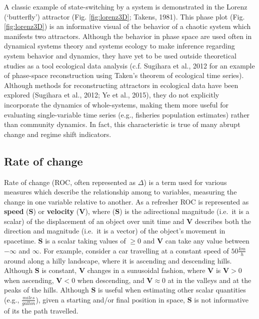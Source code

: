 \documentclass[12pt,twoside,openany]{reedthesis}
\begin{document}
A classic example of state-switching by a system is demonstrated in the Lorenz (`butterfly') attractor (Fig. \ref{fig:lorenz3D}; Takens, 1981). This phase plot (Fig. \ref{fig:lorenz3D}) is an informative visual of the behavior of a chaotic system which manifests two attractors. Although the behavior in phase space are used often in dynamical systems theory and systems ecology to make inference regarding system behavior and dynamics, they have yet to be used outside theoretical studies as a tool ecological data analysis (c.f. Sugihara et al., 2012 for an example of phase-space reconstruction using Taken's theorem of ecological time series). Although methods for reconstructing attractors in ecological data have been explored (Sugihara et al., 2012; Ye et al., 2015), they do not explicitly incorporate the dynamics of whole-systems, making them more useful for evaluating single-variable time series (e.g., fisheries population estimates) rather than community dynamics. In fact, this characteristic is true of many abrupt change and regime shift indicators.

\hypertarget{rate-of-change}{%
\subsection{Rate of change}\label{rate-of-change}}

Rate of change (ROC, often represented as \(\Delta\)) is a term used for various measures which describe the relationship among to variables, measuring the change in one variable relative to another. As a refresher ROC is represented as \textbf{speed} (\(\textbf{S}\)) or \textbf{velocity} (\(\textbf{V}\)), where (\(\textbf{S}\)) is the adirectional magnitude (i.e.~it is a scalar) of the displacement of an object over unit time and \(\textbf{V}\) describes both the direction and magnitude (i.e.~it is a vector) of the object's movement in spacetime. \(\textbf{S}\) is a scalar taking values of \(\geq0\) and \(\textbf{V}\) can take any value between \(-\infty\) and \(\infty\). For example, consider a car travelling at a constant speed of \(50\frac{km}{h}\) around along a hilly landscape, where it is ascending and descending hills. Although \(\textbf{S}\) is constant, \(\textbf{V}\) changes in a sunusoidal fashion, where \(\textbf{V}\) is \(\textbf{V}>0\) when ascending, \(\textbf{V}<0\) when descending, and \(\textbf{V}\approx0\) at in the valleys and at the peaks of the hills. Although \(\textbf{S}\) is useful when estimating other scalar quantities (e.g., \(\frac{miles}{gallon}\)), given a starting and/or final position in space, \(\textbf{S}\) is not informative of its the path travelled.
\end{document}
